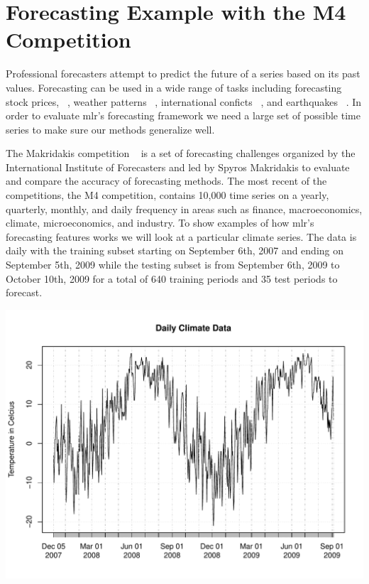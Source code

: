 \documentclass{article}\usepackage[]{graphicx}\usepackage[]{color}
\makeatletter
\def\maxwidth{ %
  \ifdim\Gin@nat@width>\linewidth
    \linewidth
  \else
    \Gin@nat@width
  \fi
}
\newenvironment{knitrout}{}{} %
\theoremstyle{definition}
\newcommand{\pkg}[1]{{\fontseries{b}\selectfont #1}}
\makeatother
\begin{document}
\section{Forecasting Example with the M4 Competition}
\label{sec:m4data}

Professional forecasters attempt to predict the future of a series based on its past values. Forecasting can be used in a wide range of tasks including forecasting stock prices, ~\cite{GRANGER19923}, weather patterns ~\cite{MurphymeteoForecast}, international conficts ~\cite{Chadefaux01012014}, and earthquakes ~\cite{earthquakeYegu}. In order to evaluate \pkg{mlr}'s forecasting framework we need a large set of possible time series to make sure our methods generalize well.

The Makridakis competition ~\cite{Makridakis2000451} is a set of forecasting challenges organized by the International Institute of Forecasters and led by Spyros Makridakis to evaluate and compare the accuracy of forecasting methods. The most recent of the competitions, the M4 competition, contains 10,000 time series on a yearly, quarterly, monthly, and daily frequency in areas such as finance, macroeconomics, climate, microeconomics, and industry. To show examples of how \pkg{mlr}'s forecasting features works we will look at a particular climate series. The data is daily with the training subset starting on September 6th, 2007 and ending on September 5th, 2009 while the testing subset is from September 6th, 2009 to October 10th, 2009 for a total of 640 training periods and 35 test periods to forecast.


\begin{knitrout}
\color{fgcolor}

{\centering \includegraphics[width=\maxwidth]{figure/get_dat_weather-1} 

}



\end{knitrout}
\end{document}
